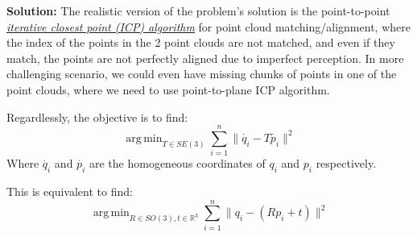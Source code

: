 \documentclass[conference,onecolumn]{IEEEtran}
\DeclareMathOperator*{\argmin}{arg\,min}
\begin{document}
\begin{enumerate}[label=\arabic{enumi}.]
          \textbf{Solution:}
          The realistic version of the problem's solution is the point-to-point \href{https://en.wikipedia.org/wiki/Iterative_closest_point}{\textit{iterative closest point (ICP) algorithm}} for point cloud matching/alignment, where the index of the points in the 2 point clouds are not matched, and even if they match, the points are not perfectly aligned due to imperfect perception.
          In more challenging scenario, we could even have missing chunks of points in one of the point clouds, where we need to use point-to-plane ICP algorithm.

          Regardlessly, the objective is to find:
          $$
              \argmin_{T \in SE(3)} \sum_{i = 1}^n \|\dot{q_i} - T\dot{p_i}\|^2
          $$
          Where $\dot{q_i}$ and $\dot{p_i}$ are the homogeneous coordinates of $q_i$ and $p_i$ respectively.

          This is equivalent to find:
          $$
              \argmin_{R \in SO(3), t \in \mathbb{R}^3} \sum_{i = 1}^n \|q_i - (Rp_i + t)\|^2
          $$
\end{enumerate}
\end{document}
